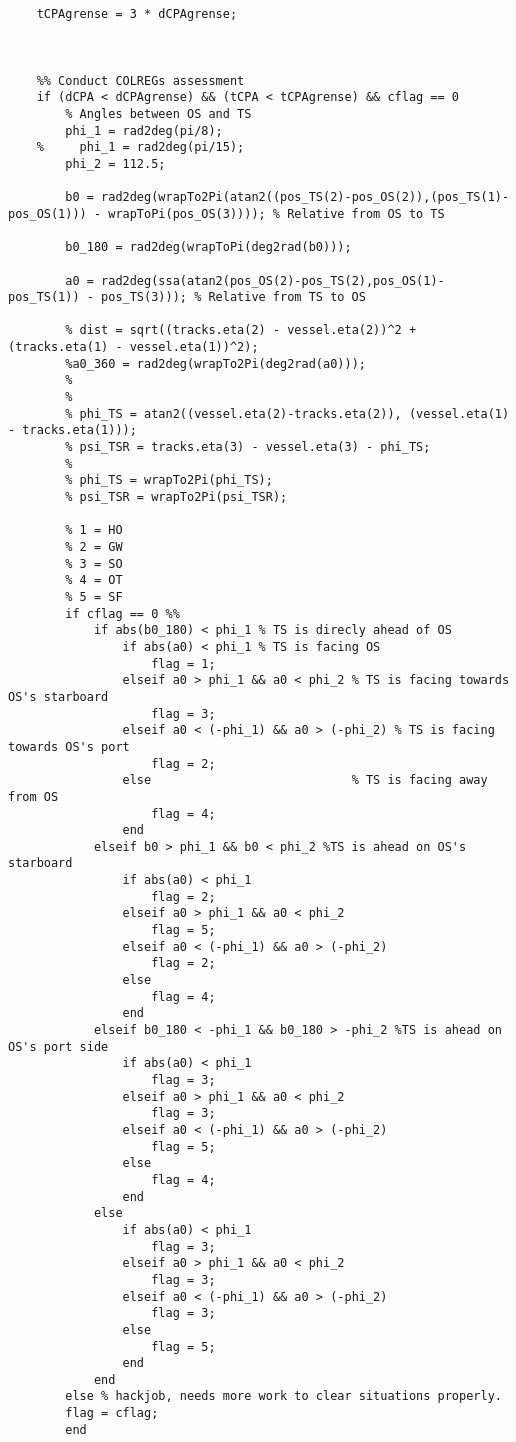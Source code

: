 \begin{lstlisting}
    tCPAgrense = 3 * dCPAgrense;
    
    
    
    %% Conduct COLREGs assessment
    if (dCPA < dCPAgrense) && (tCPA < tCPAgrense) && cflag == 0
        % Angles between OS and TS
        phi_1 = rad2deg(pi/8);
    %     phi_1 = rad2deg(pi/15);
        phi_2 = 112.5;
        
        b0 = rad2deg(wrapTo2Pi(atan2((pos_TS(2)-pos_OS(2)),(pos_TS(1)-pos_OS(1))) - wrapToPi(pos_OS(3)))); % Relative from OS to TS
    
        b0_180 = rad2deg(wrapToPi(deg2rad(b0)));
        
        a0 = rad2deg(ssa(atan2(pos_OS(2)-pos_TS(2),pos_OS(1)-pos_TS(1)) - pos_TS(3))); % Relative from TS to OS
        
        % dist = sqrt((tracks.eta(2) - vessel.eta(2))^2 + (tracks.eta(1) - vessel.eta(1))^2);
        %a0_360 = rad2deg(wrapTo2Pi(deg2rad(a0)));
        % 
        % 
        % phi_TS = atan2((vessel.eta(2)-tracks.eta(2)), (vessel.eta(1) - tracks.eta(1)));
        % psi_TSR = tracks.eta(3) - vessel.eta(3) - phi_TS;
        % 
        % phi_TS = wrapTo2Pi(phi_TS);
        % psi_TSR = wrapTo2Pi(psi_TSR);
        
        % 1 = HO
        % 2 = GW
        % 3 = SO
        % 4 = OT
        % 5 = SF
        if cflag == 0 %%
            if abs(b0_180) < phi_1 % TS is direcly ahead of OS
                if abs(a0) < phi_1 % TS is facing OS
                    flag = 1;
                elseif a0 > phi_1 && a0 < phi_2 % TS is facing towards OS's starboard
                    flag = 3;
                elseif a0 < (-phi_1) && a0 > (-phi_2) % TS is facing towards OS's port
                    flag = 2;
                else                            % TS is facing away from OS
                    flag = 4; 
                end
            elseif b0 > phi_1 && b0 < phi_2 %TS is ahead on OS's starboard
                if abs(a0) < phi_1
                    flag = 2;   
                elseif a0 > phi_1 && a0 < phi_2
                    flag = 5;
                elseif a0 < (-phi_1) && a0 > (-phi_2)
                    flag = 2;
                else
                    flag = 4;
                end
            elseif b0_180 < -phi_1 && b0_180 > -phi_2 %TS is ahead on OS's port side
                if abs(a0) < phi_1
                    flag = 3;   
                elseif a0 > phi_1 && a0 < phi_2
                    flag = 3;
                elseif a0 < (-phi_1) && a0 > (-phi_2)
                    flag = 5;
                else
                    flag = 4;
                end
            else
                if abs(a0) < phi_1
                    flag = 3;   
                elseif a0 > phi_1 && a0 < phi_2
                    flag = 3;
                elseif a0 < (-phi_1) && a0 > (-phi_2)
                    flag = 3;
                else
                    flag = 5;
                end    
            end
        else % hackjob, needs more work to clear situations properly.
        flag = cflag;
        end
            

\end{lstlisting}
